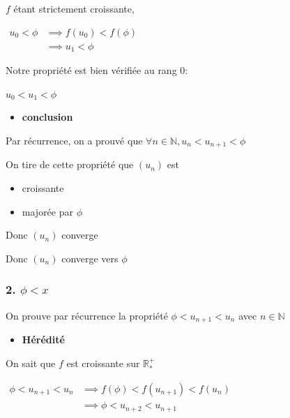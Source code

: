 \documentclass[]{scrartcl}
\providecommand{\tightlist}{%
  \setlength{\itemsep}{0pt}\setlength{\parskip}{0pt}}
\begin{document}
\(f\) étant strictement croissante,

\(\begin{array}{cl} u_0 < \phi &\implies f(u_0) < f(\phi)\\[2ex] &\implies u_1 < \phi \end{array}\)

Notre propriété est bien vérifiée au rang 0:

\(u_0 < u_1 < \phi\)

\vspace*{2cm}{}

\begin{itemize}
\tightlist
\item
  \textbf{conclusion}
\end{itemize}

Par récurrence, on a prouvé que
\(\forall n \in \mathbb{N}, u_n < u_{n+1} < \phi\)

On tire de cette propriété que \((u_n)\) est

\begin{itemize}
\tightlist
\item
  croissante
\item
  majorée par \(\phi\)
\end{itemize}

Donc \((u_n)\) converge

Donc \((u_n)\) converge vers \(\phi\)

\vspace*{2cm}{}

\hypertarget{phi-x}{%
\subsubsection{\texorpdfstring{2.
\(\phi < x\)}{2. \textbackslash{}phi \textless{} x}}\label{phi-x}}

On prouve par récurrence la propriété \(\phi < u_{n+1} < u_n\) avec
\(n \in \mathbb{N}\)

\begin{itemize}
\tightlist
\item
  \textbf{Hérédité}
\end{itemize}

On sait que \(f\) est croissante sur \(\mathbb{R}^+_*\)

\(\begin{array}{cl} \phi < u_{n+1} < u_n &\implies f(\phi) < f(u_{n+1}) < f(u_n)\\ &\implies \phi < u_{n+2} < u_{n+1} \end{array}\)
\end{document}
